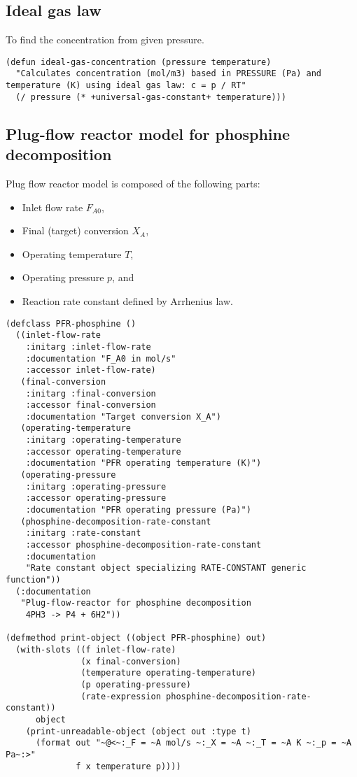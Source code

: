 \documentclass[listings, a4paper, fleqn, pdftex, 12pt, openany, oneside, final]{memoir}
\theoremstyle{definition}
\begin{document}
\subsection{Ideal gas law}
\label{sec:orgheadline3}
To find the concentration from given pressure.

\begin{verbatim}
(defun ideal-gas-concentration (pressure temperature)
  "Calculates concentration (mol/m3) based in PRESSURE (Pa) and
temperature (K) using ideal gas law: c = p / RT"
  (/ pressure (* +universal-gas-constant+ temperature)))
\end{verbatim}

\subsection{Plug-flow reactor model for phosphine decomposition}
\label{sec:orgheadline4}
Plug flow reactor model is composed of the following parts:
\begin{itemize}
\item Inlet flow rate \(F_{A0}\),
\item Final (target) conversion \(X_{A}\),
\item Operating temperature \(T\),
\item Operating pressure \(p\), and
\item Reaction rate constant defined by Arrhenius law.
\end{itemize}

\begin{verbatim}
(defclass PFR-phosphine ()
  ((inlet-flow-rate
    :initarg :inlet-flow-rate
    :documentation "F_A0 in mol/s"
    :accessor inlet-flow-rate)
   (final-conversion
    :initarg :final-conversion
    :accessor final-conversion
    :documentation "Target conversion X_A")
   (operating-temperature
    :initarg :operating-temperature
    :accessor operating-temperature
    :documentation "PFR operating temperature (K)")
   (operating-pressure
    :initarg :operating-pressure
    :accessor operating-pressure
    :documentation "PFR operating pressure (Pa)")
   (phosphine-decomposition-rate-constant
    :initarg :rate-constant
    :accessor phosphine-decomposition-rate-constant
    :documentation
    "Rate constant object specializing RATE-CONSTANT generic function"))
  (:documentation
   "Plug-flow-reactor for phosphine decomposition
    4PH3 -> P4 + 6H2"))

(defmethod print-object ((object PFR-phosphine) out)
  (with-slots ((f inlet-flow-rate)
               (x final-conversion)
               (temperature operating-temperature)
               (p operating-pressure)
               (rate-expression phosphine-decomposition-rate-constant))
      object
    (print-unreadable-object (object out :type t)
      (format out "~@<~:_F = ~A mol/s ~:_X = ~A ~:_T = ~A K ~:_p = ~A Pa~:>"
              f x temperature p))))
\end{verbatim}
\end{document}
